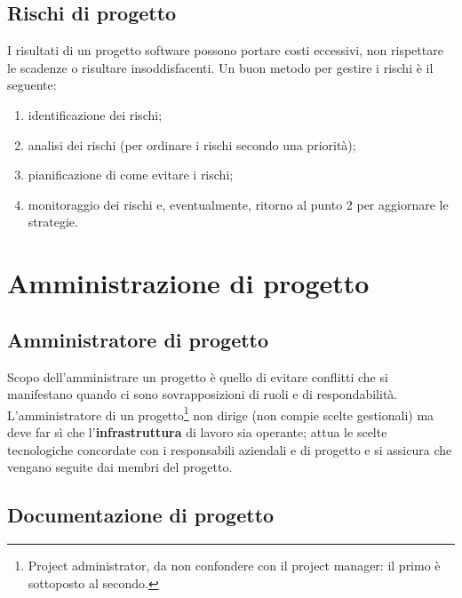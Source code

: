 \documentclass[a4paper]{article}
\begin{document}
		
	\subsection{Rischi di progetto}

		
I risultati di un progetto software possono portare costi eccessivi, non rispettare le scadenze o risultare insoddisfacenti. Un buon metodo per gestire i rischi è il seguente:
		
	\begin{enumerate}
		
			
	\item identificazione dei rischi;
			
	\item analisi dei rischi (per ordinare i rischi secondo una priorità);
			
	\item pianificazione di come evitare i rischi;
			
	\item monitoraggio dei rischi e, eventualmente, ritorno al punto 2 per aggiornare le strategie.
		
	\end{enumerate}

	


		
	\section{Amministrazione di progetto}


		
	\subsection{Amministratore di progetto}

		
Scopo dell'amministrare un progetto è quello di evitare conflitti che si manifestano quando ci sono sovrapposizioni di ruoli e di respondabilità. L'amministratore di un progetto\footnote{Project administrator, da non confondere con il project manager: il primo è sottoposto al secondo.} non dirige (non compie scelte gestionali) ma deve far sì che l'\textbf{infrastruttura} di lavoro sia operante; attua le scelte tecnologiche concordate con i responsabili aziendali e di progetto e si assicura che vengano seguite dai membri del progetto.

		
	\subsection{Documentazione di progetto}
\end{document}
